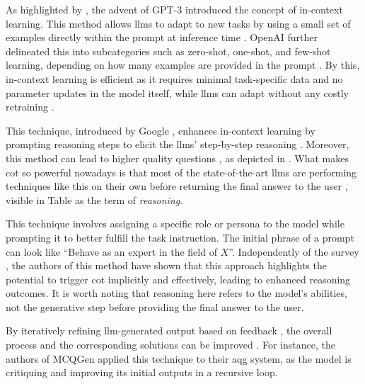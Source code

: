  As highlighted by \cite{zhao_survey_2025}, the advent of GPT-3 \cite{brown_language_2020} introduced the concept of in-context learning. This method allows \ac{llms} to adapt to new tasks by using a small set of examples directly within the prompt at inference time \cite{minaee_large_2025}. OpenAI further delineated this into subcategories such as zero-shot, one-shot, and few-shot learning, depending on how many examples are provided in the prompt \cite{brown_language_2020}. By this, in-context learning is efficient as it requires minimal task-specific data and no parameter updates in the model itself, while \ac{llms} can adapt without any costly retraining \cite{patil_review_2024,hou_large_2024}.

 This technique, introduced by Google \cite{wei_chain--thought_2022}, enhances in-context learning by prompting reasoning steps to elicit the \ac{llms}' step-by-step reasoning \cite{zhao_survey_2025}. Moreover, this method can lead to higher quality questions \cite{scaria_automated_2024}, as depicted in \cite{wei_chain--thought_2022}. What makes \ac{cot} so powerful nowadays is that most of the state-of-the-art \ac{llms} are performing techniques like this on their own before returning the final answer to the user \cite{openai_openai_2024-1}, visible in Table  as the term of \textit{reasoning}.

 This technique involves assigning a specific role or persona to the model while prompting it \cite{zhao_survey_2025} to better fulfill the task instruction. The initial phrase of a prompt can look like \enquote{Behave as an expert in the field of $X$}. Independently of the survey \cite{zhao_survey_2025}, the authors of this method \cite{kong_better_2024} have shown that this approach highlights the potential to trigger \ac{cot} implicitly and effectively, leading to enhanced reasoning outcomes. It is worth noting that reasoning here refers to the model's abilities, not the generative step before providing the final answer to the user.

 By iteratively refining \ac{llm}-generated output based on feedback \cite{madaan_self-refine_2023}, the overall process and the corresponding solutions can be improved \cite{zhao_survey_2025}. For instance, the authors of MCQGen \cite{hang_mcqgen_2024} applied this technique to their \ac{aqg} system, as the model is critiquing and improving its initial outputs in a recursive loop.

